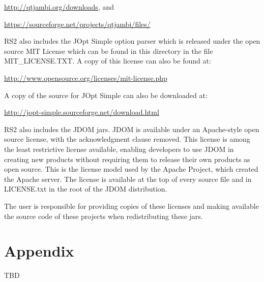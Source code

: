 \documentclass[10pt]{article}
\begin{document}
\noindent
\hyperref[http://qtjambi.org/downloads]{\color{blue}http://qtjambi.org/downloads}, and

\noindent
\hyperref[https://sourceforge.net/projects/qtjambi/files/]{\color{blue}https://sourceforge.net/projects/qtjambi/files/}

\bigbreak \noindent
RS2 also includes the JOpt Simple option parser which is released under
the open source MIT License which can be found in this directory in the file
MIT\_LICENSE.TXT.  A copy of this license can also be found at:

\noindent
\hyperref[http://www.opensource.org/licenses/mit-license.php]{\color{blue}http://www.opensource.org/licenses/mit-license.php}

\bigbreak \noindent   
A copy of the source for JOpt Simple can also be downloaded at:

\noindent
\hyperref[http://jopt-simple.sourceforge.net/download.html]{\color{blue}http://jopt-simple.sourceforge.net/download.html}

\bigbreak \noindent
RS2 also includes the JDOM jars.  JDOM is available under an Apache-style open
source license, with the acknowledgment clause removed. This license is among
the least restrictive license available, enabling developers to use JDOM in
creating new products without requiring them to release their own products as
open source. This is the license model used by the Apache Project, which created
the Apache server. The license is available at the top of every source file and
in LICENSE.txt in the root of the JDOM distribution.              

\bigbreak \noindent
The user is responsible for providing copies of these licenses and making
available the source code of these projects when redistributing these jars.

\section{Appendix}
TBD
\end{document}
